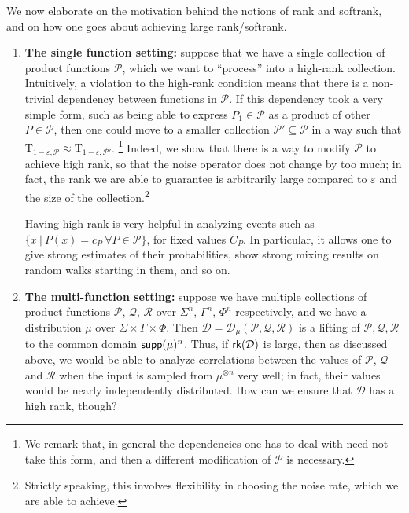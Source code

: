 \documentclass[10pt,a4paper]{amsart}
\newcommand\eps{\varepsilon}
\begin{document}
We now elaborate on the motivation behind the notions of rank and softrank, and on how one goes about achieving large rank/softrank.
\begin{enumerate}
    \item {\bf The single function setting:} suppose that we have a single collection of product functions $\mathcal{P}$, which we want to ``process'' into a high-rank collection. Intuitively, a violation to the high-rank condition means that there is a non-trivial dependency between functions in $\mathcal{P}$. If this dependency took a very simple form, such as being able to express $P_1\in\mathcal{P}$ as a product of other $P\in\mathcal{P}$, then one could move to a smaller collection $\mathcal{P}'\subseteq \mathcal{P}$ in a way such that $\mathrm{T}_{1-\eps,\mathcal{P}}\approx \mathrm{T}_{1-\eps,\mathcal{P}'}$.
    \footnote{We remark that, in general the dependencies one has to deal with need not take this form, and then a different modification of $\mathcal{P}$ is necessary.} Indeed, we show that there is a way to modify $\mathcal{P}$ to achieve high rank, so that the noise operator does not change by too much; in fact, the rank we are able to guarantee is arbitrarily large compared to $\eps$ and the size of the collection.\footnote{Strictly speaking, this involves flexibility in choosing the noise rate, which we are able to achieve.} 

    Having high rank is very helpful in analyzing events such as $\{x~|~P(x) = c_P~\forall P\in\mathcal{P}\}$, for fixed values $C_P$. In particular, it allows one to give strong estimates of their probabilities, show strong mixing results on random walks starting in them, and so on.
    
    \item {\bf The multi-function setting:} suppose we have multiple collections of product functions $\mathcal{P}$,
    $\mathcal{Q}$,
    $\mathcal{R}$ over $\Sigma^n$, $\Gamma^n$, $\Phi^n$ respectively, and we have a distribution $\mu$ over $\Sigma\times\Gamma\times \Phi$. Then  $\mathcal{D} = \mathcal{D}_{\mu}(\mathcal{P},\mathcal{Q},\mathcal{R})$ is a lifting of $\mathcal{P},\mathcal{Q},\mathcal{R}$ to the common domain ${\sf supp}(\mu)^{n}$. Thus, if ${\sf rk}(\mathcal{D})$ is large, then as discussed above, we would be able to analyze correlations between the values of $\mathcal{P}$, $\mathcal{Q}$ and $\mathcal{R}$ when the input is sampled from $\mu^{\otimes n}$ very well; in fact, their values would be nearly independently distributed. How can we ensure that $\mathcal{D}$ has a high rank, though?
    

\end{enumerate}
\end{document}
